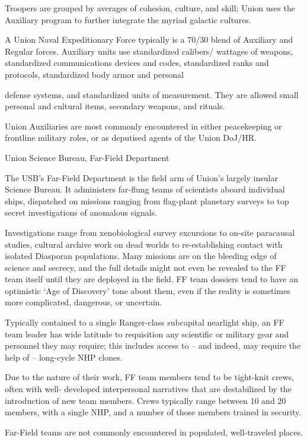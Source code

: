 Troopers are grouped by averages of cohesion, culture, and skill; Union uses the Auxiliary
program to further integrate the myriad galactic cultures.


A Union Naval Expeditionary Force typically is a 70/30 blend of Auxiliary and Regular forces.
Auxiliary units use standardized calibers/ wattages of weapons, standardized communications
devices and codes, standardized ranks and protocols, standardized body armor and personal




defense systems, and standardized units of measurement. They are allowed small personal and
cultural items, secondary weapons, and rituals.


Union Auxiliaries are most commonly encountered in either peacekeeping or frontline military
roles, or as deputised agents of the Union DoJ/HR.


Union Science Bureau, Far-Field Department

The USB’s Far-Field Department is the field arm of Union’s largely insular Science Bureau. It
administers far-flung teams of scientists aboard individual ships, dispatched on missions ranging
from flag-plant planetary surveys to top secret investigations of anomalous signals.


Investigations range from xenobiological survey excursions to on-site paracausal studies,
cultural archive work on dead worlds to re-establishing contact with isolated Diasporan
populations. Many missions are on the bleeding edge of science and secrecy, and the full details
might not even be revealed to the FF team itself until they are deployed in the field. FF team
dossiers tend to have an optimistic ‘Age of Discovery’ tone about them, even if the reality is
sometimes more complicated, dangerous, or uncertain.


Typically contained to a single Ranger-class subcapital nearlight ship, an FF team leader has
wide latitude to requisition any scientific or military gear and personnel they may require; this
includes access to -- and indeed, may require the help of -- long-cycle NHP clones.


Due to the nature of their work, FF team members tend to be tight-knit crews, often with well-
developed interpersonal narratives that are destabilized by the introduction of new team
members. Crews typically range between 10 and 20 members, with a single NHP, and a number
of those members trained in security.


Far-Field teams are not commonly encountered in populated, well-traveled places.


